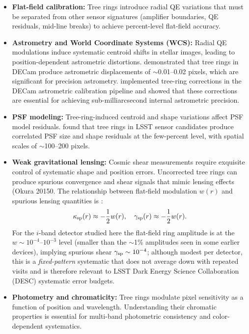 \begin{itemize}
\item \textbf{Flat-field calibration:} Tree rings introduce radial QE variations that must be separated from other sensor signatures (amplifier boundaries, QE residuals, mid-line breaks) to achieve percent-level flat-field accuracy.

\item \textbf{Astrometry and World Coordinate Systems (WCS):} Radial QE modulations induce systematic centroid shifts in stellar images, leading to position-dependent astrometric distortions. \citet{Plazas2014} demonstrated that tree rings in DECam produce astrometric displacements of $\sim$0.01--0.02 pixels, which are significant for precision astrometry. \citet{Bernstein2017} implemented tree-ring corrections in the DECam astrometric calibration pipeline and showed that these corrections are essential for achieving sub-milliarcsecond internal astrometric precision.

\item \textbf{PSF modeling:} Tree-ring-induced centroid and shape variations affect PSF model residuals. \citet{Esteves2023} found that tree rings in LSST sensor candidates produce correlated PSF size and shape residuals at the few-percent level, with spatial scales of $\sim$100--200 pixels.

\item \textbf{Weak gravitational lensing:} Cosmic shear measurements require exquisite control of systematic shape and position errors. Uncorrected tree rings can produce spurious convergence and shear signals that mimic lensing effects (Okura 20150. The relationship between flat-field modulation $w(r)$ and spurious lensing quantities is \citep{Plazas2014}:
%
\begin{equation}
\kappa_{\rm sp}(r) \approx -\frac{1}{2} w(r), \quad \gamma_{\rm sp}(r) \approx -\frac{1}{2} w(r).
\end{equation}
%
For the \lsstcam{} $i$-band detector studied here the flat-field ring amplitude is at the
$w \sim 10^{-4}$--$10^{-3}$ level (smaller than the $\sim$1\% amplitudes seen in some earlier
devices), implying spurious shear $\gamma_{\rm sp} \sim 10^{-4}$; although modest per detector,
this is a \emph{fixed-pattern} systematic that does not average down with repeated visits and
is therefore relevant to LSST Dark Energy Science Collaboration (DESC) systematic error
budgets.

\item \textbf{Photometry and chromaticity:} Tree rings modulate pixel sensitivity as a function of position and wavelength. Understanding their chromatic properties is essential for multi-band photometric consistency and color-dependent systematics.

\end{itemize}



